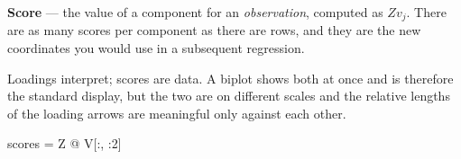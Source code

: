 \documentclass[
  letterpaper,
  10pt,
  twoside,
  openright,
  numbers=noenddot,
  chapterprefix=true]{scrbook}
\newenvironment{Shaded}{}{}
\newcommand{\DecValTok}[1]{\textcolor[rgb]{0.00,0.36,0.77}{#1}}
\newcommand{\NormalTok}[1]{\textcolor[rgb]{0.14,0.16,0.18}{#1}}
\newcommand{\OperatorTok}[1]{\textcolor[rgb]{0.14,0.16,0.18}{#1}}
\begin{document}
\begin{qmibdefinition}

{\textbf{Score}} --- the value of a component for an \emph{observation},
computed as \(Z v_j\). There are as many scores per component as there
are rows, and they are the new coordinates you would use in a subsequent
regression.

\end{qmibdefinition}

Loadings interpret; scores are data. A biplot shows both at once and is
therefore the standard display, but the two are on different scales and
the relative lengths of the loading arrows are meaningful only against
each other.

\begin{Shaded}
\begin{Highlighting}[]
\NormalTok{scores }\OperatorTok{=}\NormalTok{ Z }\OperatorTok{@}\NormalTok{ V[:, :}\DecValTok{2}\NormalTok{]}


\end{Highlighting}
\end{Shaded}
\end{document}
